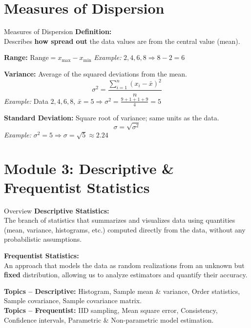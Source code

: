 \documentclass{beamer}
\begin{document}
\section{Measures of Dispersion}

\begin{frame}{Measures of Dispersion}
\textbf{Definition:}\\[0.5mm]
Describes \textbf{how spread out} the data values are from the central value (mean).

\vspace{2mm}
\textbf{Range:} $\text{Range} = x_{\max} - x_{\min}$ \quad
\textit{Example:} $2,4,6,8 \Rightarrow 8-2=6$

\vspace{2mm}
\textbf{Variance:} Average of the squared deviations from the mean.
\[
\sigma^2 = \frac{\sum_{i=1}^{n}(x_i - \bar{x})^2}{n}
\]
\textit{Example:} Data $2,4,6,8$, $\bar{x}=5 \Rightarrow \sigma^2 = \frac{9+1+1+9}{4}=5$

\vspace{2mm}
\textbf{Standard Deviation:} Square root of variance; same units as the data.
\[
\sigma = \sqrt{\sigma^2}
\]
\textit{Example:} $\sigma^2=5 \Rightarrow \sigma = \sqrt{5} \approx 2.24$
\end{frame}

\section{Module 3: Descriptive \& Frequentist Statistics}

\begin{frame}{Overview}
\textbf{Descriptive Statistics:}\\[0.5mm]
The branch of statistics that summarizes and visualizes data using quantities (mean, variance, histograms, etc.) computed directly from the data, without any probabilistic assumptions.

\vspace{2mm}
\textbf{Frequentist Statistics:}\\[0.5mm]
An approach that models the data as random realizations from an unknown but \textbf{fixed} distribution, allowing us to analyze estimators and quantify their accuracy.

\vspace{2mm}
\textbf{Topics -- Descriptive:} Histogram, Sample mean \& variance, Order statistics, Sample covariance, Sample covariance matrix.\\
\textbf{Topics -- Frequentist:} IID sampling, Mean square error, Consistency, Confidence intervals, Parametric \& Non-parametric model estimation.
\end{frame}
\end{document}
